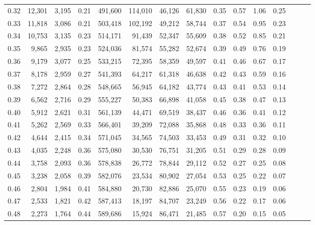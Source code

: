 \begin{tabular}{rrrrrrrrrrrrrrr}
0.32 &  12,301 &  3,195 &  0.21 &  491,600 &  114,010 &   46,126 &   61,830 &  0.35 &  0.57 &  1.06 &      0.25 \\
0.33 &  11,818 &  3,086 &  0.21 &  503,418 &  102,192 &   49,212 &   58,744 &  0.37 &  0.54 &  0.95 &      0.23 \\
0.34 &  10,753 &  3,135 &  0.23 &  514,171 &   91,439 &   52,347 &   55,609 &  0.38 &  0.52 &  0.85 &      0.21 \\
0.35 &   9,865 &  2,935 &  0.23 &  524,036 &   81,574 &   55,282 &   52,674 &  0.39 &  0.49 &  0.76 &      0.19 \\
0.36 &   9,179 &  3,077 &  0.25 &  533,215 &   72,395 &   58,359 &   49,597 &  0.41 &  0.46 &  0.67 &      0.17 \\
0.37 &   8,178 &  2,959 &  0.27 &  541,393 &   64,217 &   61,318 &   46,638 &  0.42 &  0.43 &  0.59 &      0.16 \\
0.38 &   7,272 &  2,864 &  0.28 &  548,665 &   56,945 &   64,182 &   43,774 &  0.43 &  0.41 &  0.53 &      0.14 \\
0.39 &   6,562 &  2,716 &  0.29 &  555,227 &   50,383 &   66,898 &   41,058 &  0.45 &  0.38 &  0.47 &      0.13 \\
0.40 &   5,912 &  2,621 &  0.31 &  561,139 &   44,471 &   69,519 &   38,437 &  0.46 &  0.36 &  0.41 &      0.12 \\
0.41 &   5,262 &  2,569 &  0.33 &  566,401 &   39,209 &   72,088 &   35,868 &  0.48 &  0.33 &  0.36 &      0.11 \\
0.42 &   4,644 &  2,415 &  0.34 &  571,045 &   34,565 &   74,503 &   33,453 &  0.49 &  0.31 &  0.32 &      0.10 \\
0.43 &   4,035 &  2,248 &  0.36 &  575,080 &   30,530 &   76,751 &   31,205 &  0.51 &  0.29 &  0.28 &      0.09 \\
0.44 &   3,758 &  2,093 &  0.36 &  578,838 &   26,772 &   78,844 &   29,112 &  0.52 &  0.27 &  0.25 &      0.08 \\
0.45 &   3,238 &  2,058 &  0.39 &  582,076 &   23,534 &   80,902 &   27,054 &  0.53 &  0.25 &  0.22 &      0.07 \\
0.46 &   2,804 &  1,984 &  0.41 &  584,880 &   20,730 &   82,886 &   25,070 &  0.55 &  0.23 &  0.19 &      0.06 \\
0.47 &   2,533 &  1,821 &  0.42 &  587,413 &   18,197 &   84,707 &   23,249 &  0.56 &  0.22 &  0.17 &      0.06 \\
0.48 &   2,273 &  1,764 &  0.44 &  589,686 &   15,924 &   86,471 &   21,485 &  0.57 &  0.20 &  0.15 &      0.05 \\

\end{tabular}
